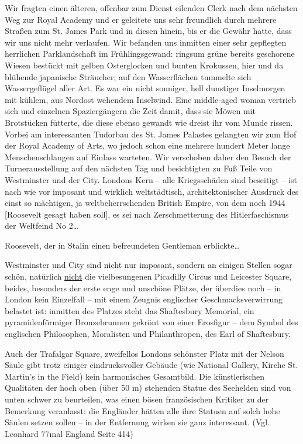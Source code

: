 Wir fragten einen älteren, offenbar zum Dienst eilenden Clerk nach dem nächsten Weg zur Royal Academy und er geleitete uns sehr freundlich durch mehrere Straßen zum St. James Park und in diesen hinein, bis er die Gewähr hatte, dass wir uns nicht mehr verlaufen. Wir befanden uns inmitten einer sehr gepflegten herrlichen Parklandschaft im Frühlingsgewand: ringsum grüne bereits geschorene Wiesen bestückt mit gelben Osterglocken und bunten Krokussen, hier und da blühende japanische Sträucher; auf den Wasserflächen tummelte sich Wassergeflügel aller Art. Es war ein nicht sonniger, hell dunstiger Inselmorgen mit kühlem, aus Nordost wehendem Inselwind. Eine middle-aged woman vertrieb sich und einzelnen Spaziergängern die Zeit damit, dass sie Möwen mit Brotstücken fütterte, die diese ebenso gewandt wie dreist ihr vom Munde  rissen. Vorbei am interessanten Tudorbau des St. James Palastes gelangten wir zum Hof der Royal Academy of Arts, wo jedoch schon eine mehrere hundert Meter lange Menschenschlangen auf Einlass warteten. Wir verschoben daher den Besuch der Turnerausstellung auf den nächsten Tag und besichtigten zu Fuß Teile von Westminster und der City. Londons Kern -- alle Kriegsschäden sind beseitigt -- ist nach wie vor imposant und wirklich weltstädtisch, architektonischer Ausdruck des einst so mächtigen, ja weltbeherrschenden British Empire, von dem noch 1944 [Roosevelt gesagt haben soll], es sei nach Zerschmetterung des Hitlerfaschismus der Weltfeind No 2\dots 

Roosevelt, der in Stalin einen befreundeten Gentleman erblickte\dots

Westminster und City sind nicht nur imposant, sondern an einigen Stellen sogar schön, natürlich \underline{nicht} die vielbesungenen Picadilly Circus und Leicester Square, beides, besonders der erste enge und unschöne Plätze, der überdies noch -- in London kein Einzelfall -- mit einem Zeugnis englischer Geschmacksverwirrung belastet ist: inmitten des Platzes steht das Shaftesbury Memorial, ein pyramidenförmiger Bronzebrunnen gekrönt von einer Erosfigur -- dem Symbol des englischen Philosophen, Moralisten und Philanthropen, des Earl of Shaftesbury.

Auch der Trafalgar Square, zweifellos Londons schönster Platz mit der Nelson Säule gibt trotz einiger eindrucksvoller Gebäude (wie National Gallery, Kirche St. Martin's in the Field) kein harmonisches Gesamtbild. Die künstlerischen Qualitäten der hoch oben (über 50 m) stehenden Statue des Seehelden sind von unten schwer zu beurteilen, was einen bösen französischen Kritiker zu der Bemerkung veranlasst: die Engländer hätten alle ihre Statuen auf solch hohe Säulen setzen sollen -- in der Entfernung wirken sie ganz interessant. (Vgl. Leonhard 77mal England Seite 414)

